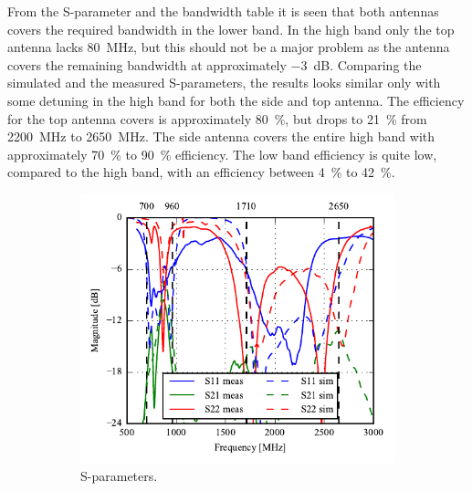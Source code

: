 From the S-parameter and the bandwidth table it is seen that both antennas covers the required bandwidth in the lower band. In the high band only the top antenna lacks \SI{80}{MHz}, but this should not be a major problem as the antenna covers the remaining bandwidth at approximately \SI{-3}{dB}. Comparing the simulated and the measured S-parameters, the results looks similar only with some detuning in the high band for both the side and top antenna.
The efficiency for the top antenna covers is approximately \SI{80}{\percent}, but drops to \SI{21}{\percent} from \SI{2200}{MHz} to \SI{2650}{MHz}. The side antenna covers the entire high band with approximately \SI{70}{\percent} to \SI{90}{\percent} efficiency. The low band efficiency is quite low, compared to the high band, with an efficiency between \SI{4}{\percent} to \SI{42}{\percent}.
 \begin{figure}[htbp]
    \centering
    \begin{subfigure}{0.49\linewidth}
        \includegraphics{img/tech_sol/nonresonant/prototype/sparams.pdf}
        \caption{S-parameters.}
    \end{subfigure}
    \hfill
    \begin{subfigure}{0.49\linewidth}

\end{subfigure}
\end{figure}

